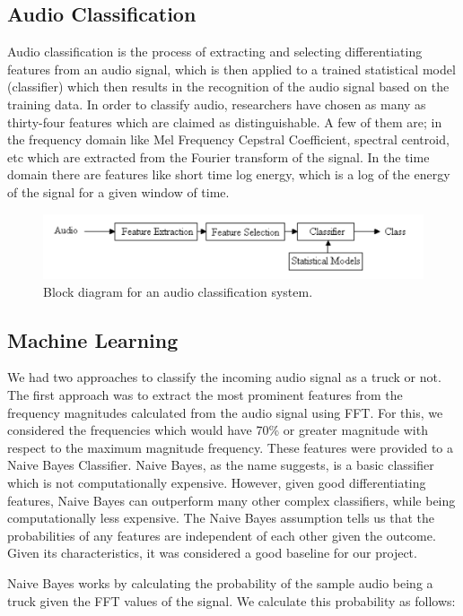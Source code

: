 \documentclass[sigconf, authorversion=false,  screen=true]{acmart}
\begin{document}
	\subsection{Audio Classification}
	Audio classification is the process of extracting and selecting differentiating features from an audio signal, which is then applied to a trained statistical model (classifier) which then results in the recognition of the audio signal based on the training data. In order to classify audio, researchers have chosen as many as thirty-four features which are claimed as distinguishable. A few of them are; in the frequency domain like Mel Frequency Cepstral Coefficient, spectral centroid, etc which are extracted from the Fourier transform of the signal. In the time domain there are features like short time log energy, which is a log of the energy of the signal for a given window of time.
	\begin{figure}
		\includegraphics[width=\linewidth]{audio_class}
		\caption{Block diagram for an audio classification system.~\cite{iit:audioclass}}
		\label{fig:audio_class}
	\end{figure}
	
	\subsection{Machine Learning}
	We had two approaches to classify the incoming audio signal as a truck or not. The first approach was to extract the most prominent features from the frequency magnitudes calculated from the audio signal using FFT. For this, we considered the frequencies which would have 70\% or greater magnitude with respect to the maximum magnitude frequency. These features were provided to a Naive Bayes Classifier. Naive Bayes, as the name suggests, is a basic classifier which is not computationally expensive. However, given good differentiating features, Naive Bayes can outperform many other complex classifiers, while being computationally less expensive. The Naive Bayes assumption tells us that the probabilities of any features are independent of each other given the outcome. Given its characteristics, it was considered a good baseline for our project. 
	
	Naive Bayes works by calculating the probability of the sample audio being a truck given the FFT values of the signal. We calculate this probability as follows:
	
\end{document}
